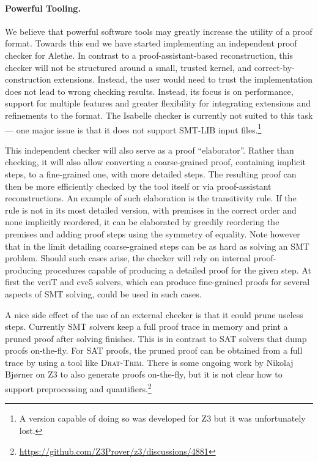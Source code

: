 \documentclass[submission,copyright,creativecommons]{eptcs}
\begin{document}
\paragraph{Powerful Tooling.}

We believe that powerful software tools may greatly increase the utility of a
proof format.
%
Towards this end we have started implementing an independent proof checker for
Alethe.
%
In contrast to a proof-assistant-based reconstruction, this checker will not be
structured around a small, trusted kernel, and correct-by-construction
extensions.  Instead, the user would need to trust the implementation does not
lead to wrong checking results.
%
Instead, its focus is on performance, support for multiple features and greater
flexibility for integrating extensions and refinements to the format.
%
The Isabelle checker is currently not suited
to this task --- one major issue is that it does not support SMT-LIB input
files.\footnote{A version capable of doing so was developed for Z3 but it was unfortunately lost.}

This independent checker will also serve as a proof ``elaborator''.
%
Rather than checking, it will also allow converting a coarse-grained proof,
containing implicit steps, to a fine-grained one, with more detailed steps. The
resulting proof can then be more efficiently checked by the tool itself or
via proof-assistant reconstructions.
%
An example of such elaboration is the transitivity rule.
%
If the rule is not in its most detailed version, with premises in the correct
order and none implicitly reordered, it can be elaborated by greedily reordering
the premises and adding proof steps using the symmetry of equality.
%
Note however that in the limit detailing coarse-grained steps can be as hard as
solving an SMT problem. Should such cases arise, the checker will rely on internal
proof-producing procedures capable of producing a detailed proof for the given
step. At first the veriT and cvc5 solvers, which can produce fine-grained proofs
for several aspects of SMT solving, could be used in such cases.

A nice side effect of the use of an external checker is that it could prune useless
steps. Currently SMT solvers keep a full proof trace in memory and print a pruned
proof after solving finishes. This is in contrast to SAT solvers that dump proofs
on-the-fly. For SAT proofs, the pruned proof can be obtained from a full trace by using a tool like
\textsc{Drat-Trim}. There is some ongoing work by Nikolaj Bjørner on Z3 to also generate proofs
on-the-fly, but it is not clear how to support preprocessing and quantifiers.\footnote{\url{https://github.com/Z3Prover/z3/discussions/4881}}
\end{document}
